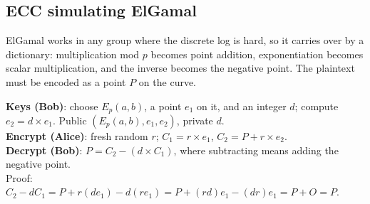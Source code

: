 \subsection{ECC simulating ElGamal \hot}

ElGamal works in any group where the discrete log is hard, so it carries over by a dictionary: multiplication mod $p$ becomes point addition, exponentiation becomes scalar multiplication, and the inverse becomes the negative point. The plaintext must be encoded as a point $P$ on the curve.

\begin{mustknow}[: EC ElGamal]
\textbf{Keys (Bob)}: choose $E_p(a, b)$, a point $e_1$ on it, and an integer $d$; compute $e_2 = d \times e_1$. Public $(E_p(a, b), e_1, e_2)$, private $d$.\\
\textbf{Encrypt (Alice)}: fresh random $r$; \;$C_1 = r \times e_1$, \;$C_2 = P + r \times e_2$.\\
\textbf{Decrypt (Bob)}: $P = C_2 - (d \times C_1)$, where subtracting means adding the negative point.\\
Proof: $C_2 - d C_1 = P + r(d e_1) - d(r e_1) = P + (rd) e_1 - (dr) e_1 = P + O = P$.
\end{mustknow}

